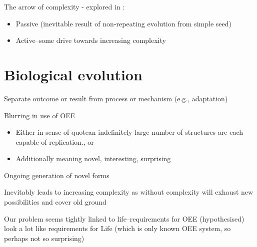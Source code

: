 The arrow of complexity - explored in \autocite{Miconi:2008cy}:
\begin{itemize}
	\item Passive (inevitable result of non-repeating evolution from simple seed)
	\item Active--some drive towards increasing complexity
\end{itemize}

\section{Biological evolution}\label{evolution}



Separate outcome or result from process or mechanism (e.g., adaptation)

Blurring in use of OEE

\begin{itemize}
	\item Either in sense of quote{an indefinitely large number of structures are each capable of replication.}{\autocite{MaynardSmith1999}}, or
	\item Additionally meaning novel, interesting, surprising
\end{itemize}

Ongoing generation of novel forms

Inevitably leads to increasing complexity as without complexity will exhaust new possibilities and cover old ground

Our problem seems tightly linked to life--requirements for OEE (hypothesised) look a lot like requirements for Life (which is only known OEE system, so perhaps not so surprising)

